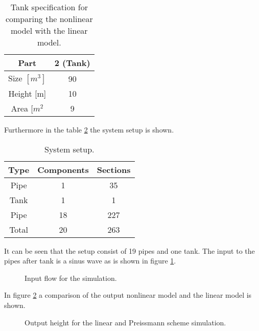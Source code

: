 \begin{table}[H]
\centering
\begin{tabular}{|c|c|}
\hline
Part& 2 (Tank)  \\ \hline
Size $[m^3]$                                              & 90 \\ \hline
Height {[}m{]}                                             & 10 \\ \hline
Area {[}$m^2$                                              & 9  \\ \hline
\end{tabular}
\caption{Tank specification for comparing the nonlinear model with the linear model. }
\label{tab:tank_data_nonlinear_linear_test}
\end{table}

Furthermore in the table \ref{tab:system_setup_nonlinear_linear_test} the system setup is shown.

\begin{table}[H]
\centering
\begin{tabular}{|c|c|c|}
\hline
	\rowcolor[HTML]{9B9B9B} 
Type  & Components & Sections \\ \hline
Pipe  & 1         & 35       \\ \hline
Tank  & 1         & 1        \\ \hline
Pipe  & 18        & 227      \\ \hline
Total & 20        & 263      \\ \hline
\end{tabular}
\caption{System setup.}
\label{tab:system_setup_nonlinear_linear_test}
\end{table}

It can be seen that the setup consist of 19 pipes and one tank. The input to the pipes after tank is a sinus wave as is shown in figure \ref{fig:height_input_for_comparision}.  

\begin{figure}[H]
 \centering
 
\caption{Input flow for the simulation.}
\label{fig:height_input_for_comparision}
\end{figure}

In figure \ref{fig:height_output_nonlinear_and_linear_model} a comparison of the output nonlinear model and the linear model is shown.

\begin{figure}[H]
 \centering
 
\caption{Output height for the linear and Preissmann scheme simulation.}
\label{fig:height_output_nonlinear_and_linear_model}
\end{figure}
 


